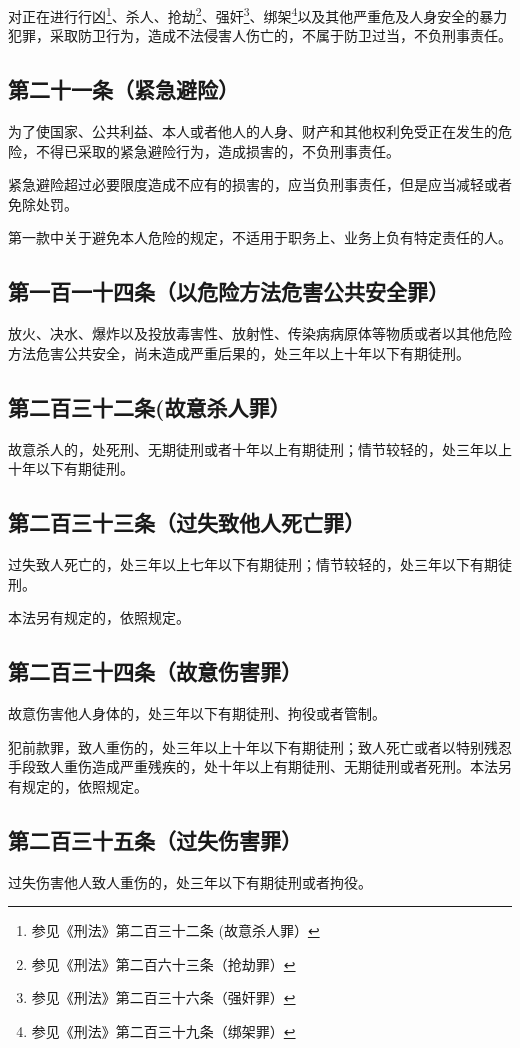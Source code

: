 \documentclass[utf-8,10pt]{ctexart}
\begin{document}
对正在进行行凶\footnote{参见《刑法》第二百三十二条 (故意杀人罪）}、杀人、抢劫\footnote{参见《刑法》第二百六十三条（抢劫罪）}、强奸\footnote{参见《刑法》第二百三十六条（强奸罪）}、绑架\footnote{参见《刑法》第二百三十九条（绑架罪）}以及其他严重危及人身安全的暴力犯罪，采取防卫行为，造成不法侵害人伤亡的，不属于防卫过当，不负刑事责任。
\subsection{第二十一条（紧急避险）}
为了使国家、公共利益、本人或者他人的人身、财产和其他权利免受正在发生的危险，不得已采取的紧急避险行为，造成损害的，不负刑事责任。

紧急避险超过必要限度造成不应有的损害的，应当负刑事责任，但是应当减轻或者免除处罚。

第一款中关于避免本人危险的规定，不适用于职务上、业务上负有特定责任的人。
\subsection{第一百一十四条（以危险方法危害公共安全罪）}
放火、决水、爆炸以及投放毒害性、放射性、传染病病原体等物质或者以其他危险方法危害公共安全，尚未造成严重后果的，处三年以上十年以下有期徒刑。
\subsection{第二百三十二条(故意杀人罪）}
故意杀人的，处死刑、无期徒刑或者十年以上有期徒刑；情节较轻的，处三年以上十年以下有期徒刑。
\subsection{第二百三十三条（过失致他人死亡罪）}
过失致人死亡的，处三年以上七年以下有期徒刑；情节较轻的，处三年以下有期徒刑。

本法另有规定的，依照规定。
\subsection{第二百三十四条（故意伤害罪）}
故意伤害他人身体的，处三年以下有期徒刑、拘役或者管制。

犯前款罪，致人重伤的，处三年以上十年以下有期徒刑；致人死亡或者以特别残忍手段致人重伤造成严重残疾的，处十年以上有期徒刑、无期徒刑或者死刑。本法另有规定的，依照规定。
\subsection{第二百三十五条（过失伤害罪）}
过失伤害他人致人重伤的，处三年以下有期徒刑或者拘役。
\end{document}
